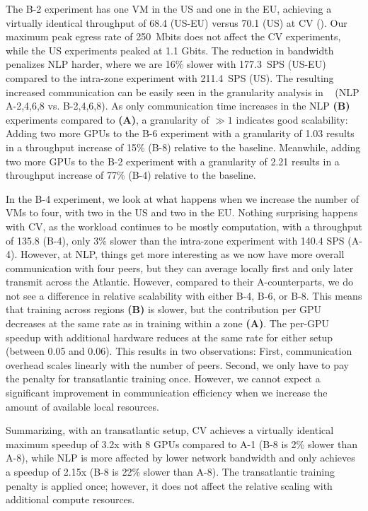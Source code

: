 The B-2 experiment has one VM in the US and one in the EU, achieving a virtually identical throughput of 68.4 (US-EU) versus 70.1 (US) at CV (). 
Our maximum peak egress rate of 250~Mbits does not affect the CV experiments, while the US experiments peaked at 1.1 Gbits.
The reduction in bandwidth penalizes NLP harder, where we are 16\% slower with 177.3~SPS (US-EU) compared to the intra-zone experiment with 211.4~SPS (US).
The resulting increased communication can be easily seen in the granularity analysis in ~ (NLP A-2,4,6,8 vs. B-2,4,6,8).
As only communication time increases in the NLP \textbf{(B)} experiments compared to \textbf{(A)}, a granularity of $\gg1$ indicates good scalability: 
Adding two more GPUs to the B-6 experiment with a granularity of 1.03 results in a throughput increase of 15\% (B-8) relative to the baseline.
Meanwhile, adding two more GPUs to the B-2 experiment with a granularity of 2.21 results in a throughput increase of 77\% (B-4) relative to the baseline.

In the B-4 experiment, we look at what happens when we increase the number of VMs to four, with two in the US and two in the EU.
Nothing surprising happens with CV, as the workload continues to be mostly computation, with a throughput of 135.8 (B-4), only 3\% slower than the intra-zone experiment with 140.4 SPS (A-4).
However, at NLP, things get more interesting as we now have more overall communication with four peers, but they can average locally first and only later transmit across the Atlantic.
However, compared to their A-counterparts, we do not see a difference in relative scalability with either B-4, B-6, or B-8. %
This means that training across regions \textbf{(B)} is slower, but the contribution per GPU decreases at the same rate as in training within a zone \textbf{(A)}.
The per-GPU speedup with additional hardware reduces at the same rate for either setup (between 0.05 and 0.06).
This results in two observations: First, communication overhead scales linearly with the number of peers.
Second, we only have to pay the penalty for transatlantic training once.
However, we cannot expect a significant improvement in communication efficiency when we increase the amount of available local resources.

Summarizing, with an transatlantic setup, CV achieves a virtually identical maximum speedup of 3.2x with 8 GPUs compared to A-1 (B-8 is 2\% slower than A-8), while NLP is more affected by lower network bandwidth and only achieves a speedup of 2.15x (B-8 is 22\% slower than A-8).
The transatlantic training penalty is applied once;  however, it does not affect the relative scaling with additional compute resources.


